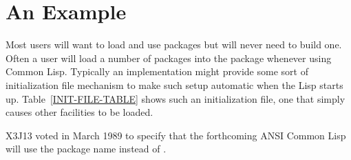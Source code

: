 \section{An Example}
\label{PACKAGE-EXAMPLE-SECTION}

\begin{obsolete}\noindent
Most users will want to load and use packages but will never need to
build one.  Often a user will load a number of packages into the
 package whenever using Common Lisp.  Typically an implementation
might provide some sort of initialization file  mechanism to make such setup
automatic when the Lisp starts up.  Table~\ref{INIT-FILE-TABLE}
shows such an initialization file, one that simply
causes other facilities to be loaded.
\end{obsolete}

\begin{newer}
X3J13 voted in March 1989  to specify that
the forthcoming ANSI Common Lisp will use the package name 
instead of .
\end{newer}

